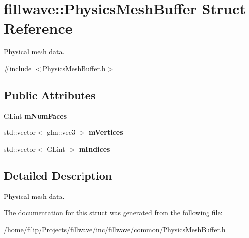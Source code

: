 \hypertarget{structfillwave_1_1PhysicsMeshBuffer}{}\section{fillwave\+:\+:Physics\+Mesh\+Buffer Struct Reference}
\label{structfillwave_1_1PhysicsMeshBuffer}


Physical mesh data.  




{\ttfamily \#include $<$Physics\+Mesh\+Buffer.\+h$>$}

\subsection*{Public Attributes}
\begin{DoxyCompactItemize}
\item 
\hypertarget{structfillwave_1_1PhysicsMeshBuffer_a30736c8a47ffcb0edd18d79b8dd0059f}{}G\+Lint {\bfseries m\+Num\+Faces}\label{structfillwave_1_1PhysicsMeshBuffer_a30736c8a47ffcb0edd18d79b8dd0059f}

\item 
\hypertarget{structfillwave_1_1PhysicsMeshBuffer_ac102e6b604039f55cac5f9bbedb62b8f}{}std\+::vector$<$ glm\+::vec3 $>$ {\bfseries m\+Vertices}\label{structfillwave_1_1PhysicsMeshBuffer_ac102e6b604039f55cac5f9bbedb62b8f}

\item 
\hypertarget{structfillwave_1_1PhysicsMeshBuffer_a90312fb69ce36b1447dcbe623f5b842f}{}std\+::vector$<$ G\+Lint $>$ {\bfseries m\+Indices}\label{structfillwave_1_1PhysicsMeshBuffer_a90312fb69ce36b1447dcbe623f5b842f}

\end{DoxyCompactItemize}


\subsection{Detailed Description}
Physical mesh data. 

The documentation for this struct was generated from the following file\+:\begin{DoxyCompactItemize}
\item 
/home/filip/\+Projects/fillwave/inc/fillwave/common/Physics\+Mesh\+Buffer.\+h\end{DoxyCompactItemize}
